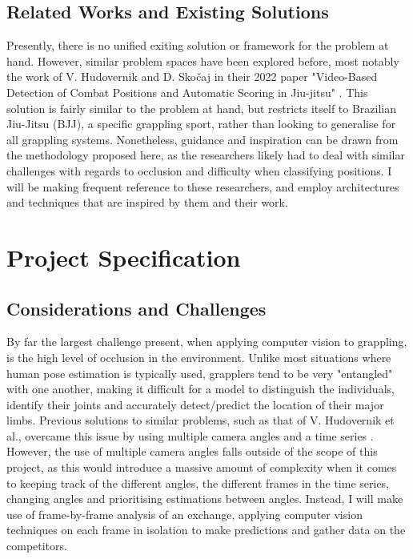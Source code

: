 \documentclass[a4paper, oneside, 11pt]{article}
\begin{document}
\subsection{Related Works and Existing Solutions}

Presently, there is no unified exiting solution or framework for the problem at hand. However, similar problem spaces have been explored before, most notably the work of V. Hudovernik and D. Skočaj in their 2022 paper "Video-Based Detection of Combat Positions and Automatic Scoring in Jiu-jitsu" \cite{IdentifyingBJJPositions}. This solution is fairly similar to the problem at hand, but restricts itself to Brazilian Jiu-Jitsu (BJJ), a specific grappling sport, rather than looking to generalise for all grappling systems. Nonetheless, guidance and inspiration can be drawn from the methodology proposed here, as the researchers likely had to deal with similar challenges with regards to occlusion and difficulty when classifying positions. I will be making frequent reference to these researchers, and employ architectures and techniques that are inspired by them and their work.

\section{Project Specification}

\subsection{Considerations and Challenges}

By far the largest challenge present, when applying computer vision to grappling, is the high level of occlusion in the environment. Unlike most situations where human pose estimation is typically used, grapplers tend to be very "entangled" with one another, making it difficult for a model to distinguish the individuals, identify their joints and accurately detect/predict the location of their major limbs. Previous solutions to similar problems, such as that of V. Hudovernik et al., overcame this issue by using multiple camera angles and a time series \cite{IdentifyingBJJPositions}. However, the use of multiple camera angles falls outside of the scope of this project, as this would introduce a massive amount of complexity when it comes to keeping track of the different angles, the different frames in the time series, changing angles and prioritising estimations between angles. Instead, I will make use of frame-by-frame analysis of an exchange, applying computer vision techniques on each frame in isolation to make predictions and gather data on the competitors.
\end{document}
